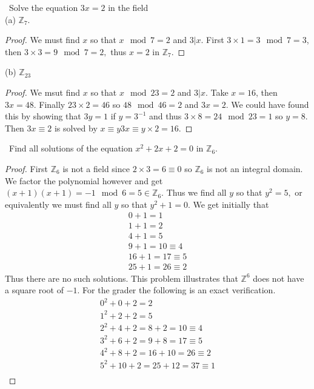 \documentclass[11pt]{amsart}
\begin{document}
\medskip {}\ Solve the equation $3x =2$ in the field\\
(a) $\mathbb{Z}_7$.
\begin{proof}	
	We must find $x$ so that $x \mod 7 = 2$ and $3 | x$.
	First $3\times 1 = 3 \mod 7 = 3$, then $3 \times 3 = 9 \mod 7 = 2,$ thus $x = 2$ in $\mathbb{Z}_7.$
\end{proof}
(b) $\mathbb{Z}_{23}$
\begin{proof}
	We msut find $x$ so that $x \mod 23 = 2$ and $3 | x$.
	Take $x = 16$, then $3x = 48.$ Finally $23\times 2 = 46$ so $48 \mod 46 = 2$ and $3x = 2.$ We could have found this by showing that $3y = 1 $ if $y = 3^{-1}$ and thus $3\times 8 = 24 \mod 23 = 1$ so $y = 8$.
	Then $3x \equiv 2$ is solved by $x \equiv y3x  \equiv y \times 2 = 16.$ 
\end{proof}
\medskip {}\ Find all solutions of the equation $x^2 + 2x + 2= 0$ in $\mathbb{Z}_6.$
\begin{proof}
	First $\mathbb{Z}_6$ is not a field since $2 \times 3 = 6 \equiv 0$ so $\mathbb{Z}_6$ is not an integral domain. We factor the polynomial however and get
	$(x+1)(x+1) = -1 \mod 6 = 5 \in \mathbb{Z}_6.$ Thus we find all $y$ so that $y^2 = 5,$ or
	equivalently we must find all $y$ so that $y^2 +1 = 0.$ We get initially that
	\begin{equation*}
		\begin{aligned}
			0 +1 = 1 \\
			1 + 1= 2\\
			4 + 1= 5  \\
			9 + 1 = 10 \equiv 4 \\
			16 + 1 = 17 \equiv 5 \\
			25 + 1 = 26 \equiv 2	
		\end{aligned}
	\end{equation*}
	Thus there are no such solutions. This problem illustrates that $\mathbb{Z}^6$ does not have a square root of $-1$. For the grader the following is an exact verification.
	\begin{equation*}
		\begin{aligned}
			0^2 + 0 + 2 = 2 \\
			1^2 + 2 + 2 = 5 \\
			2^2 + 4 + 2 = 8 + 2= 10 \equiv 4 \\
			3^2 + 6 + 2 = 9 + 8 = 17 \equiv 5 \\
			4^2 + 8 + 2 = 16 + 10 = 26 \equiv 2 \\
			5^2 + 10 + 2 = 25 + 12 = 37 \equiv 1 \\
		\end{aligned}
	\end{equation*}
\end{proof}
\end{document}
